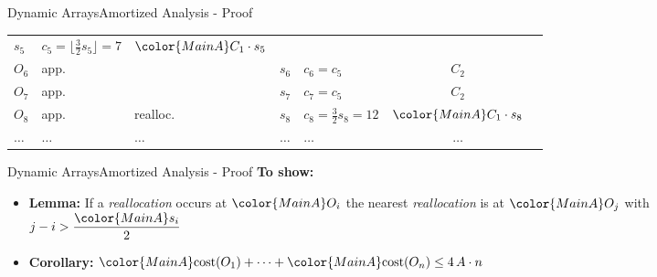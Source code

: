 \begin{frame}{Dynamic Arrays}{Amortized Analysis - Proof}
\begin{table}[!h]
\begin{tabular}{|l|l|l|l|l|c|@{}l}
      $s_5$ & {\color{MainA}$c_5 = \lfloor\frac{3}{2} s_5\rfloor=7$} &
      ${\color{MainA}C_1 \cdot s_5}$ &
      \raisebox{-0.5em}{\multirow{3}{*}{%
        $\left.\begin{array}{@{}l@{}}\\[3.05em]\end{array}\right\rbrace
        \begin{array}{@{}l@{}}
          \text{distance}\\
           3\geq\left\lfloor\dfrac{{\color{MainA}s_5}}{2}\right\rfloor
        \end{array}$%
      }}\\
      $O_6$ &app.& {} & $s_6$ & $c_6 = c_5$ & $C_2$\\
      $O_7$ &app.& {} & $s_7$ & $c_7 = c_5$ & $C_2$\\
      \cline{1-6}
      $O_8$ &app.& {\color{MainA}realloc.} &
      $s_8$ & {\color{MainA}$c_8 = \frac{3}{2} s_8=12$} &
      ${\color{MainA}C_1 \cdot s_8}$\\
      $\dots$ & $\dots$ & $\dots$ & $\dots$ & $\dots$& $\dots$\\
      \cline{1-6}
    \end{tabular}
  \end{table}
\end{frame}


\begin{frame}{Dynamic Arrays}{Amortized Analysis - Proof}
  \textbf{To show:}
  \begin{itemize}
    \item
      \textbf{Lemma:}
      If a \textit{reallocation} occurs at ${\color{MainA}O_i}$
      the nearest \textit{reallocation} is at ${\color{MainA}O_j}$
      with $j - i > \dfrac{{\color{MainA}s_i}}{2}$
    \item
      \textbf{Corollary:}
      ${\color{MainA}\mathrm{cost}(O_1)}+\dots
        +{\color{MainA}\mathrm{cost}(O_n)} \leq 4 \, A \cdot n$
  \end{itemize}
\end{frame}



